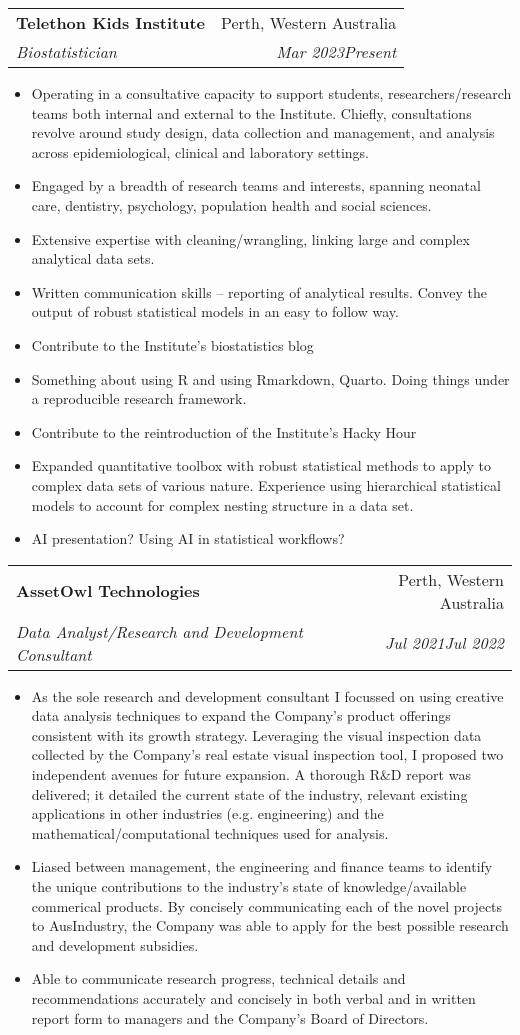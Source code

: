 \documentclass[letterpaper,10.8pt]{article}
\makeatletter
\newcommand{\resumeItem}[2]{
  \item\small{
    \textbf{#1}{#2 \vspace{-2pt}}
  }
}
\newcommand{\resumeSubheading}[4]{
  \vspace{-1pt}\item
    \begin{tabular*}{0.97\textwidth}{l@{\extracolsep{\fill}}r}
      \textbf{#1} & #2 \\
      \textit{\small#3} & \textit{\small #4} \\
    \end{tabular*}\vspace{-5pt}
}
\newcommand{\resumeItemListStart}{\begin{itemize}}
\newcommand{\resumeItemListEnd}{\end{itemize}\vspace{-5pt}}
\makeatother
\begin{document}
    \resumeSubheading
    {Telethon Kids Institute}{Perth, Western Australia}
    {Biostatistician}{Mar 2023\textendash Present}
    \resumeItemListStart
        \resumeItem{}{Operating in a consultative capacity to support students, researchers/research teams both internal and external to the Institute. Chiefly, consultations revolve around study design, data collection and management, and analysis across epidemiological, clinical and laboratory settings.}
        \resumeItem{}{Engaged by a breadth of research teams and interests, spanning neonatal care, dentistry, psychology, population health and social sciences.}
        \resumeItem{}{Extensive expertise with cleaning/wrangling, linking large and complex analytical data sets.}
        \resumeItem{}{Written communication skills -- reporting of analytical results. Convey the output of robust statistical models in an easy to follow way.}
        \resumeItem{}{Contribute to the Institute's biostatistics blog}
        \resumeItem{}{Something about using R and using Rmarkdown, Quarto. Doing things under a reproducible research framework.}
        \resumeItem{}{Contribute to the reintroduction of the Institute's Hacky Hour}
        \resumeItem{}{Expanded quantitative toolbox with robust statistical methods to apply to complex data sets of various nature. Experience using hierarchical statistical models to account for complex nesting structure in a data set.}
        \resumeItem{}{AI presentation? Using AI in statistical workflows?}
    \resumeItemListEnd
    
    \resumeSubheading
    {AssetOwl Technologies}{Perth, Western Australia}
    {Data Analyst/Research and Development Consultant}{Jul 2021\textendash Jul 2022}
    \resumeItemListStart
        \resumeItem{}{As the sole research and development consultant I focussed on using creative data analysis techniques to expand the Company's product offerings consistent with its growth strategy. Leveraging the visual inspection data collected by the Company's real estate visual inspection tool, I proposed two independent avenues for future expansion. A thorough R\&D report was delivered; it detailed the current state of the industry, relevant existing applications in other industries (e.g. engineering) and the mathematical/computational techniques used for analysis.}
        \resumeItem{}{Liased between management, the engineering and finance teams to identify the unique contributions to the industry's state of knowledge/available commerical products. By concisely communicating each of the novel projects to AusIndustry, the Company was able to apply for the best possible research and development subsidies.}
        \resumeItem{}{Able to communicate research progress, technical details and recommendations accurately and concisely in both verbal and in written report form to managers and the Company's Board of Directors.}
    \resumeItemListEnd
      
\end{document}
